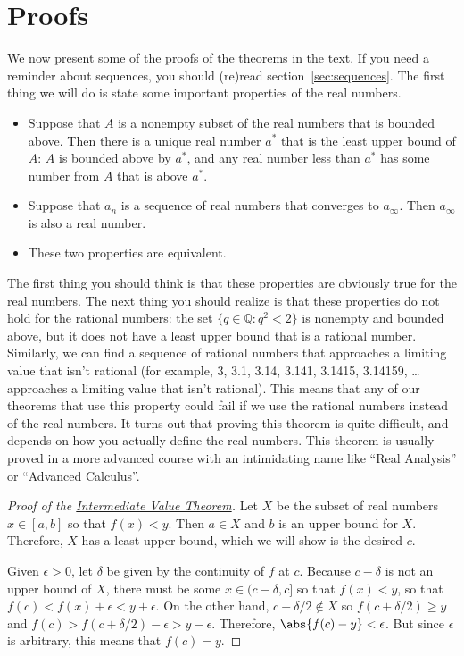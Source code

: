 \chapter{Proofs}

We now present some of the proofs of the theorems in the text.  If you need a reminder about sequences, you should (re)read section~\ref{sec:sequences}.  The first thing we will do is state some important properties of the real numbers.

{\begin{itemize}
\item Suppose that $A$ is a nonempty subset of the real numbers that is bounded above.  Then there is a unique real number $a^*$ that is the least upper bound of $A$: $A$ is bounded above by $a^*$, and any real number less than $a^*$ has some number from $A$ that is above $a^*$.
\item Suppose that $a_n$ is a sequence of real numbers that converges to $a_\infty$.  Then $a_\infty$ is also a real number.
\item These two properties are equivalent.
\end{itemize}}

The first thing you should think is that these properties are obviously true for the real numbers.  The next thing you should realize is that these properties do not hold for the rational numbers: the set $\{q\in\mathbb{Q}:q^2<2\}$ is nonempty and bounded above, but it does not have a least upper bound that is a rational number.  Similarly, we can find a sequence of rational numbers that approaches a limiting value that isn't rational (for example, 3, 3.1, 3.14, 3.141, 3.1415, 3.14159, \ldots approaches a limiting value that isn't rational).  This means that any of our theorems that use this property could fail if we use the rational numbers instead of the real numbers.  It turns out that proving this theorem is quite difficult, and depends on how you actually define the real numbers.  This theorem is usually proved in a more advanced course with an intimidating name like ``Real Analysis'' or ``Advanced Calculus''.

\begin{proof}[Proof of the {\hyperref[thm:IVT]{Intermediate Value Theorem}}]
\label{pf:IVT}
Let $X$ be the subset of real numbers $x\in[a,b]$ so that $f(x)<y$.  Then $a\in X$ and $b$ is an upper bound for $X$.  Therefore, $X$ has a least upper bound, which we will show is the desired $c$.

Given $\epsilon>0$, let $\delta$ be given by the continuity of $f$ at $c$.  Because $c-\delta$ is not an upper bound of $X$, there must be some $x\in(c-\delta,c]$ so that $f(x)<y$, so that $f(c)<f(x)+\epsilon<y+\epsilon$.  On the other hand, $c+\delta/2\notin X$ so $f(c+\delta/2)\ge y$ and $f(c)>f(c+\delta/2)-\epsilon>y-\epsilon$.  Therefore, $\abs{f(c)-y}<\epsilon$.  But since $\epsilon$ is arbitrary, this means that $f(c)=y$.
\end{proof}

